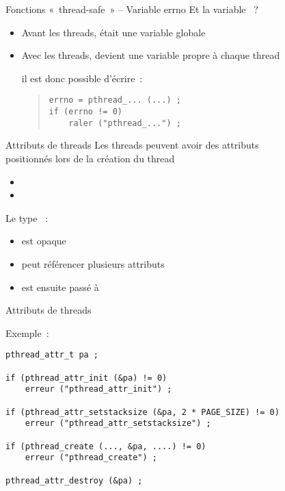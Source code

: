 \begin {frame} [fragile] {Fonctions «~thread-safe~» -- Variable errno}
    Et la variable ~?

    \begin {itemize}
	\item Avant les threads,  était une variable
	    globale

	\item Avec les threads,  devient une variable
	    propre à chaque thread

	    \vspace* {2mm}

	    \implique il est donc possible d'écrire~:

\begin {quote}
\begin {lstlisting}
errno = pthread_... (...) ;
if (errno != 0)
    raler ("pthread_...") ;
\end{lstlisting}
\end {quote}

    \end {itemize}

\end{frame}


\begin {frame} {Attributs de threads}
    Les threads peuvent avoir des attributs \\
    \implique positionnés lors de la création du thread

    \begin {itemize}
	\item {}
	\item {}
    \end {itemize}

    \vspace* {3mm}

    Le type ~:
    \begin {itemize}
	\item est opaque
	\item peut référencer plusieurs attributs
	\item est ensuite passé à 
    \end {itemize}
\end {frame}

\begin {frame} [fragile] {Attributs de threads}

Exemple~:

\begin {lstlisting}
pthread_attr_t pa ;

if (pthread_attr_init (&pa) != 0)
    erreur ("pthread_attr_init") ;

if (pthread_attr_setstacksize (&pa, 2 * PAGE_SIZE) != 0)
    erreur ("pthread_attr_setstacksize") ;

if (pthread_create (..., &pa, ....) != 0)
    erreur ("pthread_create") ;

pthread_attr_destroy (&pa) ;
\end{lstlisting}
\end{frame}



